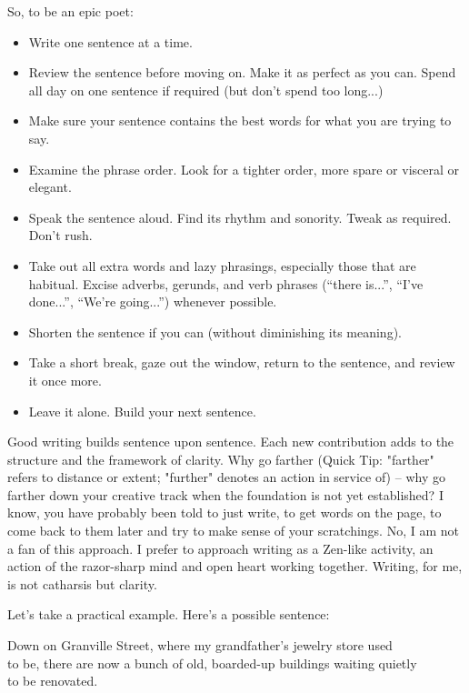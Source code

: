 \documentclass[letterpaper,10pt,headsepline]{scrreprt}
\begin{document}
So, to be an epic poet:
\begin{itemize}
\item Write one sentence at a time.
\item Review the sentence before moving on. Make it as perfect as you can. Spend all day on one sentence if required (but don't spend too long...)
\item Make sure your sentence contains the best words for what you are trying to say.
\item Examine the phrase order. Look for a tighter order, more spare or visceral or elegant.
\item Speak the sentence aloud. Find its rhythm and sonority. Tweak as required. Don't rush.
\item Take out all extra words and lazy phrasings, especially those that are habitual. Excise adverbs, gerunds, and verb phrases (``there is...'', ``I've done...'', ``We're going...'') whenever possible.
\item Shorten the sentence if you can (without diminishing its meaning).
\item Take a short break, gaze out the window, return to the sentence, and review it once more.
\item Leave it alone. Build your next sentence.
\end{itemize}

Good writing builds sentence upon sentence. Each new contribution adds to the structure and the framework of clarity. Why go farther (Quick Tip: "farther" refers to distance or extent; "further" denotes an action in service of) -- why go farther down your creative track when the foundation is not yet established? I know, you have probably been told to just write, to get words on the page, to come back to them later and try to make sense of your scratchings. No, I am not a fan of this approach. I prefer to approach writing as a Zen-like activity, an action of the razor-sharp mind and open heart working together. Writing, for me, is not catharsis but clarity.

Let's take a practical example. Here's a possible sentence:

\vspace{1em}

\textsf{Down on Granville Street, where my grandfather's jewelry store used \\
to be, there are now a bunch of old, boarded-up buildings waiting quietly \\
to be renovated.}
\vspace{1em}
\end{document}
